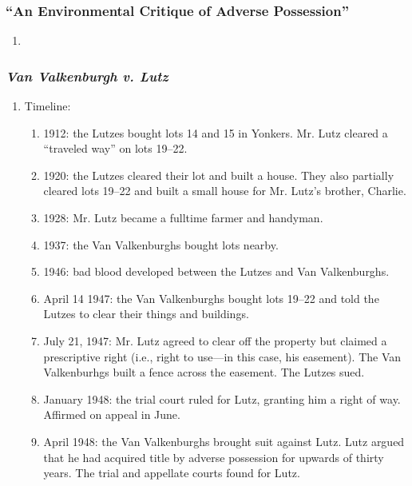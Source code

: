 \subsubsection{``An Environmental Critique of Adverse Possession''}

\begin{enumerate}
    \item %
\end{enumerate}

\subsubsection{\emph{Van Valkenburgh v. Lutz}}

\begin{enumerate}
    \item Timeline:
    \begin{enumerate}
        \item 1912: the Lutzes bought lots 14 and 15 in Yonkers. Mr. Lutz 
        cleared a ``traveled way'' on lots 19--22.
        \item 1920: the Lutzes cleared their lot and built a house. They also 
        partially cleared lots 19--22 and built a small house for Mr. Lutz's 
        brother, Charlie.
        \item 1928: Mr. Lutz became a fulltime farmer and handyman.
        \item 1937: the Van Valkenburghs bought lots nearby.
        \item 1946: bad blood developed between the Lutzes and Van 
        Valkenburghs.
        \item April 14 1947: the Van Valkenburghs bought lots 19--22 and told the 
        Lutzes to clear their things and buildings.
        \item July 21, 1947: Mr. Lutz agreed to clear off the property but 
        claimed a prescriptive right (i.e., right to use---in this case, his 
        easement). The Van Valkenburhgs built a fence across the easement. The 
        Lutzes sued.
        \item January 1948: the trial court ruled for Lutz, granting him a 
        right of way. Affirmed on appeal in June.
        \item April 1948: the Van Valkenburghs brought suit against Lutz. Lutz 
        argued that he had acquired title by adverse possession for upwards of 
        thirty years. The trial and appellate courts found for Lutz.
    \end{enumerate}

\end{enumerate}
